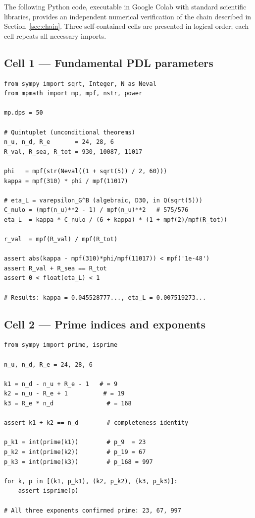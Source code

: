 \documentclass[12pt,a4paper]{article}
\theoremstyle{plain}
\theoremstyle{definition}
\theoremstyle{remark}
\newenvironment{codebox}[1][]{%
  \begin{tcolorbox}[breakable, codestyle, title={#1}]}{\end{tcolorbox}}
\begin{document}
The following Python code, executable in Google Colab with standard scientific libraries, provides an independent numerical verification of the chain described in Section~\ref{sec:chain}. Three self-contained cells are presented in logical order; each cell repeats all necessary imports.

\clearpage

\subsection{Cell 1 — Fundamental PDL parameters}
\label{subsec:cell1}

\begin{codebox}[Cell~1: Fundamental PDL parameters (50-decimal precision)]
\begin{verbatim}
from sympy import sqrt, Integer, N as Neval
from mpmath import mp, mpf, nstr, power

mp.dps = 50

# Quintuplet (unconditional theorems)
n_u, n_d, R_e       = 24, 28, 6
R_val, R_sea, R_tot = 930, 10087, 11017

phi   = mpf(str(Neval((1 + sqrt(5)) / 2, 60)))
kappa = mpf(310) * phi / mpf(11017)

# eta_L = varepsilon_G^B (algebraic, D30, in Q(sqrt(5)))
C_nulo = (mpf(n_u)**2 - 1) / mpf(n_u)**2   # 575/576
eta_L  = kappa * C_nulo / (6 + kappa) * (1 + mpf(2)/mpf(R_tot))

r_val  = mpf(R_val) / mpf(R_tot)

assert abs(kappa - mpf(310)*phi/mpf(11017)) < mpf('1e-48')
assert R_val + R_sea == R_tot
assert 0 < float(eta_L) < 1

# Results: kappa = 0.045528777..., eta_L = 0.007519273...
\end{verbatim}
\end{codebox}

\subsection{Cell 2 — Prime indices and exponents}
\label{subsec:cell2}

\begin{codebox}[Cell~2: Prime indices and exponents]
\begin{verbatim}
from sympy import prime, isprime

n_u, n_d, R_e = 24, 28, 6

k1 = n_d - n_u + R_e - 1   # = 9
k2 = n_u - R_e + 1          # = 19
k3 = R_e * n_d               # = 168

assert k1 + k2 == n_d        # completeness identity

p_k1 = int(prime(k1))        # p_9  = 23
p_k2 = int(prime(k2))        # p_19 = 67
p_k3 = int(prime(k3))        # p_168 = 997

for k, p in [(k1, p_k1), (k2, p_k2), (k3, p_k3)]:
    assert isprime(p)

# All three exponents confirmed prime: 23, 67, 997
\end{verbatim}
\end{codebox}
\end{document}
